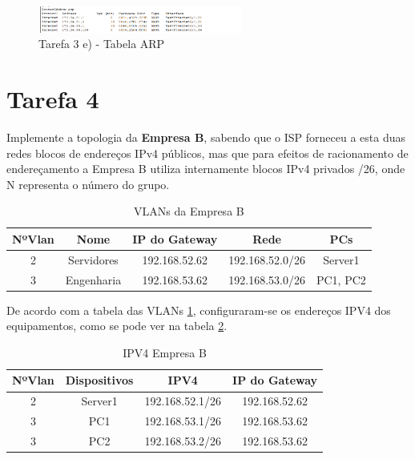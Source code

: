 \documentclass[11pt,english, openright, oneside]{book}
\begin{document}
\begin{figure}[H]
    \centering
    \includegraphics[width=0.6\textwidth]{imagens/Tarefa3/3.e.2.png}
    \caption{Tarefa 3 e) - Tabela ARP}
    \label{fig:3.e.2}
\end{figure}
\vspace{0.8cm}

\pagebreak

\section{Tarefa 4}
Implemente a topologia da \textbf{Empresa B}, sabendo que o ISP forneceu a esta duas redes blocos de endereços IPv4 públicos, mas que para efeitos de racionamento de endereçamento a Empresa B utiliza internamente blocos IPv4 privados /26, onde N representa o número do grupo.  
\vspace{0.2cm}

\begin{table}[h!]
    \centering
    \begin{tabular}{|c|c|c|c|c|}
    \hline
         \textbf{NºVlan} & \textbf{Nome} & \textbf{IP do Gateway} & \textbf{Rede} & \textbf{PCs}\\
    \hline
        2 & Servidores & 192.168.52.62 & 192.168.52.0/26 & Server1\\
        3 & Engenharia & 192.168.53.62 & 192.168.53.0/26 & PC1, PC2\\
    \hline
    \end{tabular}
    \caption{VLANs da Empresa B}
    \label{tab:vlansB}
\end{table}
\vspace{0.2cm}

De acordo com a tabela das VLANs \ref{tab:vlansB}, configuraram-se os endereços IPV4 dos equipamentos, como se pode ver na tabela \ref{tab:ipB}.
\vspace{0.2cm}

\begin{table}[h!]
    \centering
    \begin{tabular}{|c|c|c|c|}
    \hline
        \textbf{NºVlan} & \textbf{Dispositivos} & \textbf{IPV4} & \textbf{IP do Gateway}\\
    \hline
        2 & Server1 & 192.168.52.1/26 & 192.168.52.62\\
        3 & PC1 & 192.168.53.1/26 & 192.168.53.62\\
        3 & PC2 & 192.168.53.2/26 & 192.168.53.62\\
    \hline
    \end{tabular}
    \caption{IPV4 Empresa B}
    \label{tab:ipB}
\end{table}
\vspace{0.2cm}
\end{document}
